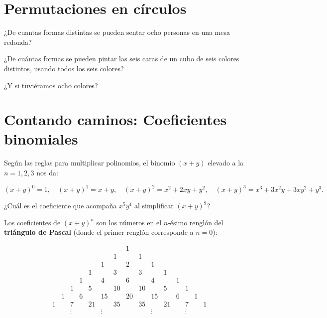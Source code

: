 \section{Permutaciones en círculos}

\begin{ejercicio}
¿De cuantas formas distintas se pueden sentar ocho personas en una mesa redonda?
\end{ejercicio}
\vspace{4cm}

\begin{ejercicio}
¿De cuántas formas se pueden pintar las seis caras de un cubo de seis colores distintos, usando todos los seis colores?

¿Y si tuviéramos ocho colores?
\end{ejercicio}


\section{Contando caminos: Coeficientes binomiales}

Según las reglas para multiplicar polinomios, el binomio $(x+y)$ elevado a la $n=1,2,3$ nos da:

$$(x+y)^0=1,\quad (x+y)^1=x+y,\quad (x+y)^2=x^2+2xy+y^2, \quad (x+y)^3=x^3+3x^2y+3xy^2+y^3.$$


\begin{ejercicio}
¿Cuál es el coeficiente que acompaña $x^5y^4$ al simplificar $(x+y)^9$?
\end{ejercicio}
\vspace{2cm}

Los coeficientes de $(x+y)^n$ son los números en el $n$-ésimo renglón del {\bf triángulo de Pascal} (donde el primer renglón corresponde a $n=0$):

$$\begin{array}{ccccccccccccccc}
     &&&&&&& 1 &&&&&&&  \\
    &&&&&& 1 && 1 &&&&&& \\
   &&&&& 1 && 2 && 1 &&&&& \\
  &&&& 1 && 3 && 3 && 1 &&&& \\
 &&& 1 && 4 && 6 && 4 && 1 &&& \\
&& 1 && 5 && 10 && 10 && 5 && 1 &&\\
& 1 && 6 && 15 && 20 && 15 && 6 && 1 &\\
1 && 7 && 21 && 35 && 35 && 21 && 7 && 1\\
&& \vdots && &\vdots && && \vdots && &\vdots
\end{array}$$


